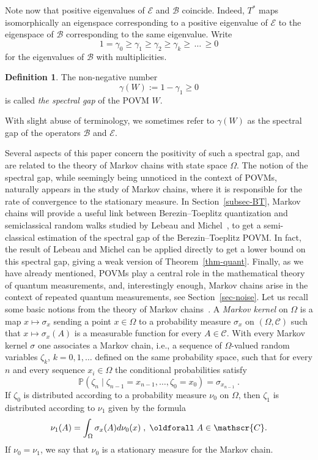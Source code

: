 \documentclass[11pt]{article}
\theoremstyle{definition}
\newtheorem{defi}[theo]{Definition}
\numberwithin{equation}{section}
\numberwithin{figure}{section}
\numberwithin{table}{section}
\newcommand{\cB}{{\mathcal{B}}}
\newcommand{\cE}{{\mathcal{E}}}
\renewcommand\geq {\geqslant}
\newcommand\< {\mathcal{h}}
\renewcommand\> {\mathcal{i}}
\newcommand*\cC{\mathscr{C}}
\renewcommand*{\forall}{\mathrel{\oldforall}}
\begin{document}
Note now that positive eigenvalues of $\cE$ and $\cB$ coincide. Indeed, $T^*$ maps isomorphically an eigenspace corresponding to a positive eigenvalue of $\cE$ to the eigenspace of $\cB$ corresponding to the same eigenvalue. Write
\[
1=\gamma_0 \geq \gamma_1 \geq \gamma_2 \geq \gamma_k
\geq\,\dots\,\geq 0
\]
for the eigenvalues of $\cB$ with multiplicities.

\begin{defi}\label{def-gap}
The non-negative number
\[
\gamma(W):= 1-\gamma_1\geq 0
\]
is called \emph{the spectral gap} of the POVM $W$.
\end{defi}

With slight abuse of terminology, we sometimes refer to $\gamma(W)$ as the spectral gap of the operators $\cB$ and $\cE$.

Several aspects of this paper concern the positivity of such a spectral gap, and are related to the theory of Markov chains with state space $\Omega$. The notion of the spectral gap, while seemingly being unnoticed in the context of POVMs, naturally appears in the study of Markov chains, where it is responsible for the rate of convergence to the stationary measure. In Section~\ref{subsec-BT}, Markov chains will provide a useful link between Berezin--Toeplitz quantization and semiclassical random walks studied by Lebeau and Michel~\cite{LM}, to get a semi-classical estimation of the spectral gap of the Berezin--Toeplitz POVM. In fact, the result of Lebeau and Michel can be applied directly to get a lower bound on this spectral gap, giving a weak version of Theorem~\ref{thm-quant}. Finally, as we have already mentioned, POVMs play a central role in the mathematical theory of quantum measurements, and, interestingly enough, Markov chains arise in the context of repeated quantum measurements, see Section~\ref{sec-noise}. Let us recall some basic notions from the theory of Markov chains~\cite{Bak, Ru}. A \emph{Markov kernel} on $\Omega$ is a map $x \mapsto \sigma_x$ sending a point $x \in \Omega$ to a probability measure $\sigma_x$ on $(\Omega,\cC)$ such that $x \mapsto \sigma_x(A)$
is a measurable function for every $A \in \cC$. With every Markov kernel $\sigma$ one associates a Markov chain, i.e., a sequence of $\Omega$-valued random variables $\zeta_k$, $k = 0,1,\dots$ defined on the same probability space, such that for every $n$ and every sequence $x_i \in \Omega$ the conditional probabilities satisfy
\[
\mathbb{P}(\zeta_n \;|\; \zeta_{n-1}=x_{n-1},\dots, \zeta_0 = x_0) = \sigma_{x_{n-1}}\;.
\]
If $\zeta_0$ is distributed according to a probability measure $\nu_0$ on $\Omega$, then $\zeta_1$ is distributed according to $\nu_1$ given by the formula
\[
\nu_1(A) = \int_\Omega \sigma_x(A) d\nu_0(x)\;,\; \forall A \in \cC.
\]
If $\nu_0=\nu_1$, we say that $\nu_0$ is a stationary measure for the Markov chain.
\end{document}

